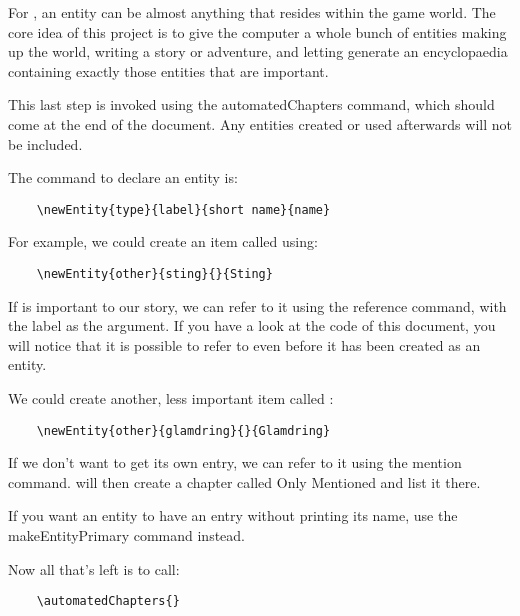 \documentclass[openany]{book}
\begin{document}
For \LoreTex{}, an entity can be almost anything that resides within the game world. The core idea of this project is to give the computer a whole bunch of entities making up the world, writing a story or adventure, and letting \LoreTex{} generate an encyclopaedia containing exactly those entities that are important.

This last step is invoked using the automatedChapters command, which should come at the end of the document. Any entities created or used afterwards will not be included.

The command to declare an entity is:
\begin{verbatim}
	\newEntity{type}{label}{short name}{name}
\end{verbatim}
For example, we could create an item called  using:
\begin{verbatim}
	\newEntity{other}{sting}{}{Sting}
\end{verbatim}
If  is important to our story, we can refer to it using the reference command, with the label as the argument. If you have a look at the code of this document, you will notice that it is possible to refer to  even before it has been created as an entity.

We could create another, less important item called :
\begin{verbatim}
	\newEntity{other}{glamdring}{}{Glamdring}
\end{verbatim}
If we don't want  to get its own entry, we can refer to it using the mention command. \LoreTex{} will then create a chapter called Only Mentioned and list it there.

If you want an entity to have an entry without printing its name, use the makeEntityPrimary command instead.


Now all that's left is to call:
\begin{verbatim}
	\automatedChapters{}
\end{verbatim}

\automatedChapters{}
\end{document}
